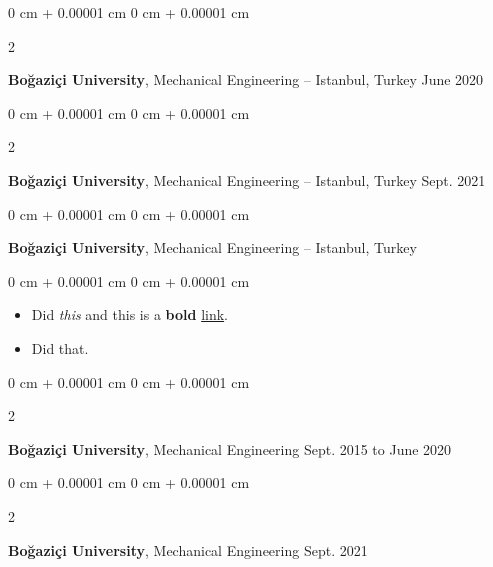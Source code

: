 \documentclass[10pt, letterpaper]{article}
\newenvironment{highlights}{
    \begin{itemize}[
        topsep=0.10 cm,
        parsep=0.10 cm,
        partopsep=0pt,
        itemsep=0pt,
        leftmargin=0 cm + 10pt
    ]
}{
    \end{itemize}
        
    \vspace{-0.10cm}
} %
\newenvironment{onecolentry}{
    \begin{adjustwidth}{
        0 cm + 0.00001 cm
    }{
        0 cm + 0.00001 cm
    }
}{
    \end{adjustwidth}
} %
\newenvironment{twocolentry}[2][]{
    \onecolentry
    \def\secondColumn{#2}
    \setcolumnwidth{\fill, 4.1 cm}
    \begin{paracol}{2}
}{
    \switchcolumn \raggedleft \secondColumn
    \end{paracol}
    \endonecolentry
} %
\begin{document}
        \begin{twocolentry}{
            June 2020
        }
            \textbf{Boğaziçi University}, Mechanical Engineering -- Istanbul, Turkey\end{twocolentry}

        \vspace{0.10 cm}


        \vspace{0.15 cm}

        \begin{twocolentry}{
            Sept. 2021
        }
            \textbf{Boğaziçi University}, Mechanical Engineering -- Istanbul, Turkey\end{twocolentry}

        \vspace{0.10 cm}


        \vspace{0.15 cm}

        \begin{onecolentry}
            \textbf{Boğaziçi University}, Mechanical Engineering -- Istanbul, Turkey\end{onecolentry}

        \vspace{0.10 cm}
        \begin{onecolentry}
            \begin{highlights}
                \item Did \textit{this} and this is a \textbf{bold} \href{https://example.com}{link}.
                \item Did that.
            \end{highlights}
        \end{onecolentry}


        \vspace{0.15 cm}

        \begin{twocolentry}{
            Sept. 2015 to June 2020
        }
            \textbf{Boğaziçi University}, Mechanical Engineering\end{twocolentry}

        \vspace{0.10 cm}


        \vspace{0.15 cm}

        \begin{twocolentry}{
            Sept. 2021
        }
            \textbf{Boğaziçi University}, Mechanical Engineering\end{twocolentry}
\end{document}
